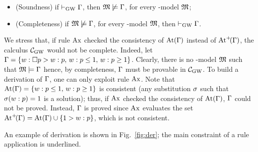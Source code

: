 \begin{itemize}
\item (Soundness) if $\vdash_{\mathrm{GW}} \Gamma$, then $\mathfrak{M}\not\models\Gamma$, for
  every \GWM-model $\mathfrak{M}$;
\item (Completeness) if $\mathfrak{M}\not\models\Gamma$, for every \GWM-model  $\mathfrak{M}$, then $\vdash_{\mathrm{GW}} \Gamma$.
\end{itemize}
We stress that, if   rule $\mathrm{Ax}$   checked the
consistency of $\mathrm{At}(\Gamma)$ instead of  $\mathrm{At}^{+}\!(\Gamma)$, the calculus $\mathcal{C}_{\mathrm{GW}}$ would  not be complete.
Indeed, let  $\Gamma=\{w : \Box p > w:p,\,w:p\leq 1,\,w:p\geq 1\}$.
Clearly, there is no  \GWM-model   $\mathfrak{M}$  such that
$\mathfrak{M}\models \Gamma$ hence,  by completeness,  $\Gamma$ must  be  provable in $\mathcal{C}_{\mathrm{GW}}$.
To build a derivation of $\Gamma$,  one can only exploit  rule $\mathrm{Ax}$.
Note that $\mathrm{At}(\Gamma)=\{w:p\leq 1,\,w:p\geq 1 \}$
is  consistent (any substitution $\sigma$ such that $\sigma(w:p)=1$ is a solution);
thus, if $\mathrm{Ax}$  checked the consistency of  $\mathrm{At}(\Gamma)$,
   $\Gamma$ could not be proved.
Instead, $\Gamma$ is proved  since $\mathrm{Ax}$   evaluates
the set $\mathrm{At}^{+}\!(\Gamma) =\mathrm{At}(\Gamma)\cup \{1 > w:p\}$, which  is not consistent.



An example of derivation is shown in Fig.~\ref{fig:der};
 the main constraint of a rule  application is underlined. 



